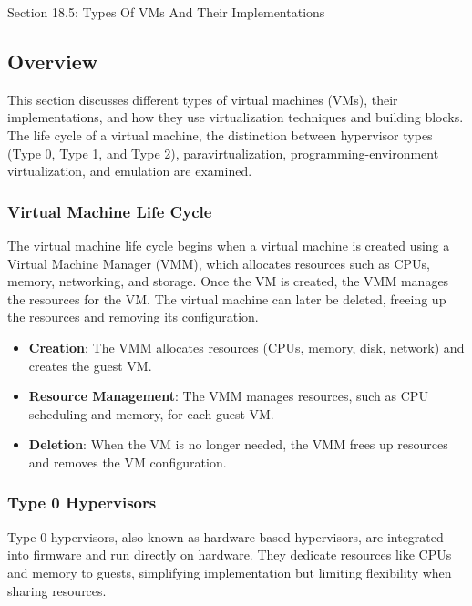 \begin{notes}{Section 18.5: Types Of VMs And Their Implementations}
    \subsection*{Overview}

    This section discusses different types of virtual machines (VMs), their implementations, and how they use virtualization techniques and building blocks. The life cycle of a virtual machine, the 
    distinction between hypervisor types (Type 0, Type 1, and Type 2), paravirtualization, programming-environment virtualization, and emulation are examined.
    
    \subsubsection*{Virtual Machine Life Cycle}
    
    The virtual machine life cycle begins when a virtual machine is created using a Virtual Machine Manager (VMM), which allocates resources such as CPUs, memory, networking, and storage. Once the VM 
    is created, the VMM manages the resources for the VM. The virtual machine can later be deleted, freeing up the resources and removing its configuration.
    
    \begin{highlight}
    
        \begin{itemize}
            \item \textbf{Creation}: The VMM allocates resources (CPUs, memory, disk, network) and creates the guest VM.
            \item \textbf{Resource Management}: The VMM manages resources, such as CPU scheduling and memory, for each guest VM.
            \item \textbf{Deletion}: When the VM is no longer needed, the VMM frees up resources and removes the VM configuration.
        \end{itemize}
    
    \end{highlight}
    
    \subsubsection*{Type 0 Hypervisors}
    
    Type 0 hypervisors, also known as hardware-based hypervisors, are integrated into firmware and run directly on hardware. They dedicate resources like CPUs and memory to guests, simplifying 
    implementation but limiting flexibility when sharing resources.
    

\end{notes}
